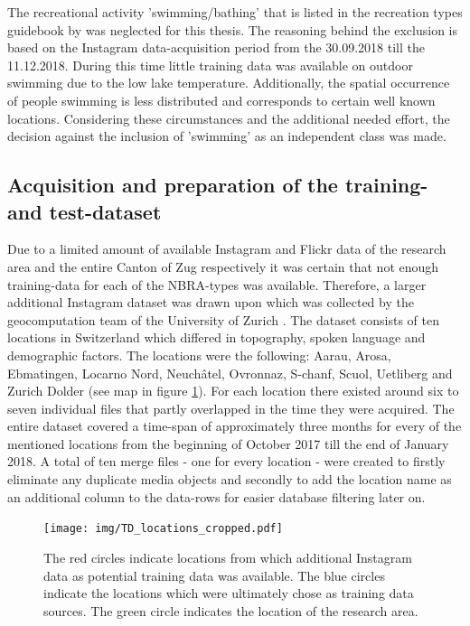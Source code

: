 \newline
The recreational activity 'swimming/bathing' that is listed in the recreation types guidebook by \textcite{IFL2018} was neglected for this thesis. The reasoning behind the exclusion is based on the Instagram data-acquisition period from the 30.09.2018 till the 11.12.2018. During this time little training data was available on outdoor swimming due to the low lake temperature. Additionally, the spatial occurrence of people swimming is less distributed and corresponds to certain well known locations. Considering these circumstances and the additional needed effort, the decision against the inclusion of 'swimming' as an independent class was made.

\subsection{Acquisition and preparation of the training- and test-dataset} \label{preparation_training_data}
Due to a limited amount of available Instagram and Flickr data of the research area and the entire Canton of Zug respectively it was certain that not enough training-data for each of the NBRA-types was available. Therefore, a larger additional Instagram dataset was drawn upon which was collected by the geocomputation team of the University of Zurich \parencite{Gruzd2016}. The dataset consists of ten locations in Switzerland which differed in topography, spoken language and demographic factors. The locations were the following: Aarau, Arosa, Ebmatingen, Locarno Nord, Neuch\^{a}tel, Ovronnaz, S-chanf, Scuol, Uetliberg and Zurich Dolder (see map in figure \ref{fig:TD_locations}). For each location there existed around six to seven individual files that partly overlapped in the time they were acquired. The entire dataset covered a time-span of approximately three months for every of the mentioned locations from the beginning of October 2017 till the end of January 2018. A total of ten merge files - one for every location - were created to firstly eliminate any duplicate media objects and secondly to add the location name as an additional column to the data-rows for easier database filtering later on.\\

\begin{figure}[h]
   \centering
   \texttt{[image: img/TD\_locations\_cropped.pdf]}
   \caption{The red circles indicate locations from which additional Instagram data as potential training data was available. The blue circles indicate the locations which were ultimately chose as training data sources. The green circle indicates the location of the research area.}
   \label{fig:TD_locations}
\end{figure}

